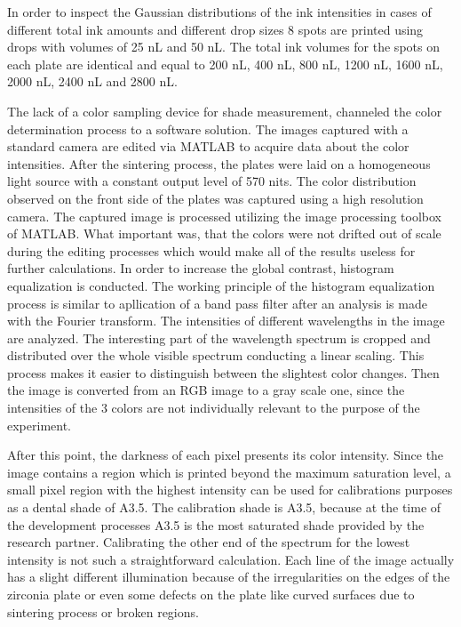 In order to inspect the Gaussian distributions of the ink intensities in cases of different total ink amounts and different drop sizes 8 spots are printed using drops with volumes of 25 nL and 50 nL. The total ink volumes for the spots on each plate are identical and equal to 200 nL, 400 nL, 800 nL, 1200 nL, 1600 nL, 2000 nL, 2400 nL and 2800 nL.

The lack of a color sampling device for shade measurement, channeled the color determination process to a software solution. The images captured with a standard camera are edited via MATLAB to acquire data about the color intensities. After the sintering process, the plates were laid on a homogeneous light source with a constant output level of 570 nits. The color distribution observed on the front side of the plates was captured using a high resolution camera. The captured image is processed utilizing the image processing toolbox of MATLAB. What important was, that the colors were not drifted out of scale during the editing processes which would make all of the results useless for further calculations. In order to increase the global contrast, histogram equalization is conducted. The working principle of the histogram equalization process is similar to apllication of a band pass filter after an analysis is made with the Fourier transform. The intensities of different wavelengths in the image are analyzed. The interesting part of the wavelength spectrum is cropped and distributed over the whole visible spectrum conducting a linear scaling. This process makes it easier to distinguish between the slightest color changes. Then the image is converted from an RGB image to a gray scale one, since the intensities of the 3 colors are not individually relevant to the purpose of the experiment. 

After this point, the darkness of each pixel presents its color intensity. Since the image contains a region which is printed beyond the maximum saturation level, a small pixel region with the highest intensity can be used for calibrations purposes as a dental shade of A3.5. The calibration shade is A3.5, because at the time of the development processes A3.5 is the most saturated shade provided by the research partner. Calibrating the other end of the spectrum for the lowest intensity is not such a straightforward calculation. Each line of the image actually has a slight different illumination because of the irregularities on the edges of the zirconia plate or even some defects on the  plate like curved surfaces due to sintering process or broken regions.

